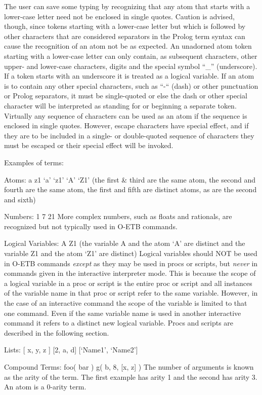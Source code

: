 \documentclass[12pt,twoside,a4paper]{article}
\begin{document}
The user can save some typing by recognizing that any atom that starts with a lower-case letter need not be enclosed in single quotes. Caution is advised, though, since tokens starting with a lower-case letter but which is followed by other characters that are considered separators in the Prolog term syntax can cause the recognition of an atom not be as expected. An unadorned atom token starting with a lower-case letter can only contain, as subsequent characters, other upper- and lower-case characters, digits and the special symbol ``\_'' (underscore). If a token starts with an underscore it is treated as a logical variable. If an atom is to contain any other special characters, such as ``-`` (dash) or other punctuation or Prolog separators, it must be single-quoted or else the dash or other special character will be interpreted as standing for or beginning a separate token. Virtually any sequence of characters can be used as an atom if the sequence is enclosed in single quotes. However, escape characters have special effect, and if they are to be included in a single- or double-quoted sequence of characters they must be escaped or their special effect will be invoked.

Examples of terms:

Atoms: a z1 `a' `z1' `A' `Z1' (the first \& third are the same atom, the second and fourth are the same atom, the first and fifth are distinct atoms, as are the second and sixth)

Numbers: 1 7 21 More complex numbers, such as floats and rationals, are recognized but not typically used in O-ETB commands.

Logical Variables: A Z1 (the variable A and the atom `A' are distinct and the variable Z1 and the atom `Z1' are distinct) Logical variables should NOT be used in O-ETB commands \emph{except} as they may be used in procs or scripts, but \emph{never} in commands given in the interactive interpreter mode. This is because the scope of a logical variable in a proc or script is the entire proc or script and all instances of the variable name in that proc or script refer to the same variable. However, in the case of an interactive command the scope of the variable is limited to that one command. Even if the same variable name is used in another interactive command it refers to a distinct new logical variable. Procs and scripts are described in the following section.

Lists: {[} x, y, z {]} {[}2, a, d{]} {[}`Name1', `Name2'{]}

Compound Terms: foo( bar ) g( b, 8, {[}x, z{]} ) The number of arguments is known as the arity of the term. The first example has arity 1 and the second has arity 3. An atom is a 0-arity term.
\end{document}
